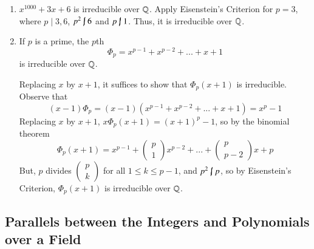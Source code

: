 \documentclass[12pt, a4paper, twoside, openright, titlepage]{book}
\begin{document}
\begin{eg}{}{}
    \leavevmode
    \begin{enumerate}
        \item $x^{1000}+3x+6$ is irreducible over $\mathbb Q$. Apply Eisenstein's Criterion for $p = 3$, where $p\;\vert\;3,6$, $p^2\;\cancel{\vert}\;6$ and $p\;\cancel{\vert}\;1$. Thus, it is irreducible over $\mathbb Q$.
        \item If $p$ is a prime, the $p$th  \begin{equation}
            \Phi_p = x^{p-1}+x^{p-2}+...+x+1
        \end{equation}
        is irreducible over $\mathbb Q$.
        \begin{proof*}{}{}
            Replacing $x$ by $x+1$, it suffices to show that $\Phi_p(x+1)$ is irreducible. Observe that $$(x-1)\Phi_p = (x-1)(x^{p-1}+x^{p-2}+...+x+1) = x^p - 1$$
            Replacing $x$ by $x+1$, $x\Phi_p(x+1) = (x+1)^p-1$, so by the binomial theorem $$\Phi_p(x+1) = x^{p-1} + \begin{pmatrix}p \\ 1 \end{pmatrix}x^{p-2} + ... + \begin{pmatrix}p \\ p-2 \end{pmatrix}x + p$$
            But, $p$ divides $\begin{pmatrix}p \\ k \end{pmatrix}$ for all $1 \leq k \leq p-1$, and $p^2\;\cancel{\vert}\;p$, so by Eisenstein's Criterion, $\Phi_p(x+1)$ is irreducible over $\mathbb Q$.
        \end{proof*}
    \end{enumerate}
\end{eg}


\subsection{\textsection Parallels between the Integers and Polynomials over a Field}
\end{document}
